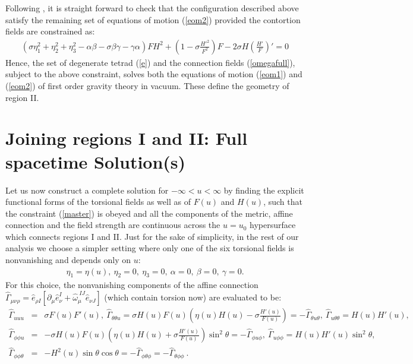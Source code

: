 \documentclass[preprint,aps,superscriptaddress,nofootinbib]{revtex4-1}
\newcommand{\del}{\partial}
\begin{document}
Following \cite {kaul}, it is straight forward to check that the 
configuration described above satisfy the remaining set of equations 
of motion  (\ref{eom2}) provided the contortion fields are 
constrained as: 
\begin{eqnarray}\label{master}
\left(\sigma\eta_1^2+\eta_2^2+\eta_3^2-\alpha\beta-\sigma\beta\gamma-
\gamma\alpha\right)FH^2
+\left(1-\sigma\frac{H'^2}{F^2}\right)F-2\sigma H\left(\frac{H'}
{F}\right)'=0
\end{eqnarray}
Hence, the set of degenerate tetrad (\ref{e}) and the connection fields 
(\ref{omegafull}), subject to the above constraint, solves both the 
equations of motion (\ref{eom1}) and (\ref{eom2}) of first order 
gravity theory in vacuum. These define the geometry of region II.
  
%
\section{Joining regions I and II: Full spacetime Solution(s)}
Let us now construct a complete solution for $-\infty<u<\infty$ by 
finding the explicit functional forms of the torsional fields as well 
as of $F(u)$ and $H(u)$, such that the constraint (\ref{master}) is 
obeyed and all the components of the metric, affine connection and 
the field strength are continuous across the $u=u_0$ hypersurface 
which connects regions I and II. Just for the sake of simplicity, 
in the rest of our analysis we choose a simpler setting where only 
one of the six torsional fields is nonvanishing and depends only on $u$:
\begin{eqnarray}\label{choice}
\eta_1=\eta (u),~\eta_2=0,~\eta_3=0,~\alpha=0,~\beta=0,~
\gamma=0.
\end{eqnarray}
For this choice, the nonvanishing components of the affine connection   
$\hat{\Gamma}_{\mu\nu\rho}=\hat{e}_{\rho I} \left[\del_\mu 
\hat{e}_\nu^I+\hat{\omega}_\mu^{~IJ}\hat{e}_{\nu J}\right]$ 
(which contain torsion now) are evaluated to be:
\begin{eqnarray}\label{gamma3}
\hat{\Gamma}_{uuu}&=&\sigma F(u) F'(u),~
\hat{\Gamma}_{\theta\theta u}=\sigma 
H(u)F(u)\left(\eta(u)H(u)-\sigma\frac{H'(u)}
{F(u)}\right)=-\hat{\Gamma}_{\theta u\theta} 
,~\hat{\Gamma}_{u\theta\theta}=H(u)H'(u),\nonumber\\
\hat{\Gamma}_{\phi\phi u}&=&-\sigma 
H(u)F(u)\left(\eta(u)H(u)+\sigma\frac{H'(u)}{F(u)}\right) \sin^2 
\theta=-\hat{\Gamma}_{\phi u\phi},
%
~\hat{\Gamma}_{u\phi\phi}=H(u)H'(u)\sin^2 \theta,\nonumber\\
\hat{\Gamma}_{\phi\phi\theta}&=&-
H^2(u)\sin\theta\cos\theta=-\hat{\Gamma}_{\phi\theta\phi}
=-\hat{\Gamma}_{\theta\phi\phi}~.
\end{eqnarray}
\end{document}
